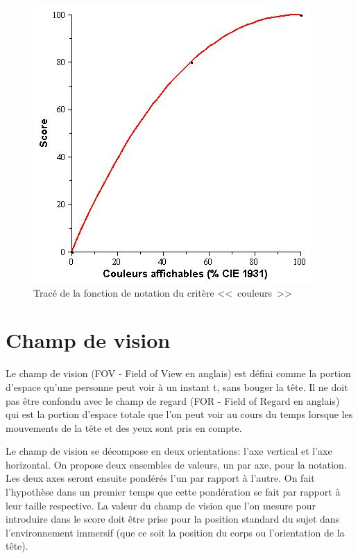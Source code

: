 	\begin{figure}[h]
		\centering
		\includegraphics[scale=.75]{Figures/Color_2}
		\caption{Tracé de la fonction de notation du critère <<~couleurs~>>}
		\label{fig:score_color}
	\end{figure}
	
	\section{Champ de vision}
	\par Le champ de vision (FOV - Field of View en anglais) est défini comme la portion d'espace qu'une personne peut voir à un instant t, sans bouger la tête. Il ne doit pas être confondu avec le champ de regard (FOR - Field of Regard en anglais) qui est la portion d'espace totale que l'on peut voir au cours du temps lorsque les mouvements de la tête et des yeux sont pris en compte.

	\par Le champ de vision se décompose en deux orientations: l'axe vertical et l'axe horizontal. On propose deux ensembles de valeurs, un par axe, pour la notation. Les deux axes seront ensuite pondérés l'un par rapport à l'autre. On fait l'hypothèse dans un premier temps que cette pondération se fait par rapport à leur taille respective. La valeur du champ de vision que l'on mesure pour introduire dans le score doit être prise pour la position standard du sujet dans l'environnement immersif (que ce soit la position du corps ou l'orientation de la tête).
	

